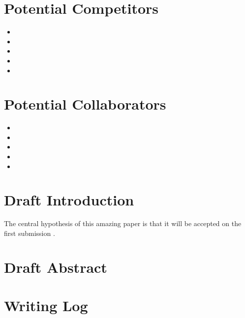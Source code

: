 \documentclass[11pt,letterpaper]{article}
\begin{document}
\section{Potential Competitors}
\label{sec:orgebb6da3}

\begin{itemize}
\item 

\item 

\item 

\item 

\item 
\end{itemize}



\section{Potential Collaborators}
\label{sec:org56f1793}

\begin{itemize}
\item 

\item 

\item 

\item 

\item 
\end{itemize}


\section{Draft Introduction}
\label{sec:orgd4fc556}

The central hypothesis of this amazing paper is that it will be accepted on the first submission \cite{chaloner1995bayesianexperimentaldesignareview}.


\section{Draft Abstract}
\label{sec:org7975cf6}



\section{Writing Log}
\label{sec:org998a008}
\end{document}
